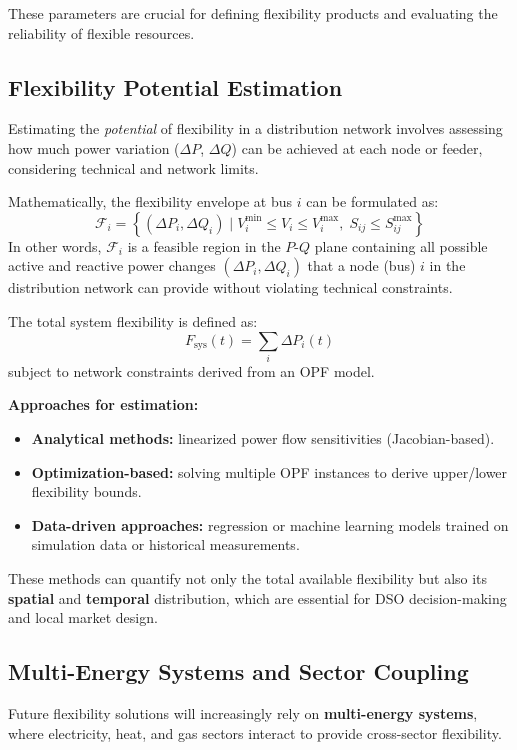 \documentclass[11pt]{article}
\begin{document}
	These parameters are crucial for defining flexibility products and evaluating the reliability of flexible resources.
	
	\subsection{Flexibility Potential Estimation}
	
	Estimating the \textit{potential} of flexibility in a distribution network involves assessing how much power variation ($\Delta P$, $\Delta Q$) can be achieved at each node or feeder, considering technical and network limits.
	
	Mathematically, the flexibility envelope at bus $i$ can be formulated as:
	\[
	\mathcal{F}_i = \left\{ (\Delta P_i, \Delta Q_i) \;|\; V_i^{\min} \le V_i \le V_i^{\max}, \; S_{ij} \le S_{ij}^{\max} \right\}
	\]
	In other words, $\mathcal{F}_i$ is a feasible region in the $P$-$Q$ plane containing all possible active and reactive power changes $(\Delta P_i,\Delta Q_i)$ that a node (bus)
	$i$ in the distribution network can provide without violating technical constraints.
	
	The total system flexibility is defined as:
	\[
	F_\text{sys}(t) = \sum_{i} \Delta P_i(t)
	\]
	subject to network constraints derived from an OPF model.
	
	\textbf{Approaches for estimation:}
	\begin{itemize}
		\item \textbf{Analytical methods:} linearized power flow sensitivities (Jacobian-based).
		\item \textbf{Optimization-based:} solving multiple OPF instances to derive upper/lower flexibility bounds.
		\item \textbf{Data-driven approaches:} regression or machine learning models trained on simulation data or historical measurements.
	\end{itemize}
	
	These methods can quantify not only the total available flexibility but also its \textbf{spatial} and \textbf{temporal} distribution, which are essential for DSO decision-making and local market design.
	
	\subsection{Multi-Energy Systems and Sector Coupling}
	
	Future flexibility solutions will increasingly rely on \textbf{multi-energy systems}, where electricity, heat, and gas sectors interact to provide cross-sector flexibility.
	
\end{document}
